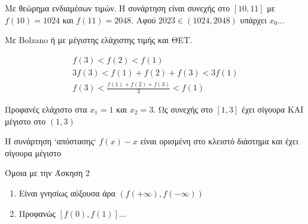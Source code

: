 \documentclass{presentation}
\begin{document}
\begin{lisi}
      Με θεώρημα ενδιαμέσων τιμών. Η συνάρτηση είναι συνεχής στο $[10,11]$ με $f(10)=1024$ και $f(11)=2048$. Αφού $2023\in (1024,2048)$ υπάρχει $x_0$...

      \hyperlink{Άσκηση1}{}
\end{lisi}

\begin{lisi}
      Με Bolzano ή με μέγιστης ελάχιστης τιμής και ΘΕΤ.

      \begin{gather*}
            f(3)<f(2)<f(1) \\
            3f(3)<f(1)+f(2)+f(3)<3f(1) \\
            f(3)<\frac{f(1)+f(2)+f(3)}{3}<f(1)
      \end{gather*}

      \hyperlink{Άσκηση2}{}
\end{lisi}

\begin{lisi}
      Προφανές ελάχιστο στα $x_1=1$ και $x_2=3$. Ως συνεχής στο $[1,3]$ έχει σίγουρα ΚΑΙ μέγιστο στο $(1,3)$

      \hyperlink{Άσκηση3}{}
\end{lisi}

\begin{lisi}
      Η συνάρτηση `απόστασης` $f(x)-x$ είναι ορισμένη στο κλειστό διάστημα και έχει σίγουρα μέγιστο

      \hyperlink{Άσκηση4}{}
\end{lisi}

\begin{lisi}
      Όμοια με την Άσκηση 2

      \hyperlink{Άσκηση5}{}
\end{lisi}

\begin{lisi}
      \begin{enumerate}
            \item Είναι γνησίως αύξουσα άρα $(f(+\infty),f(-\infty))$
            \item Προφανώς $[f(0),f(1)]$...
      \end{enumerate}

      \hyperlink{Άσκηση6}{}
\end{lisi}
\end{document}
